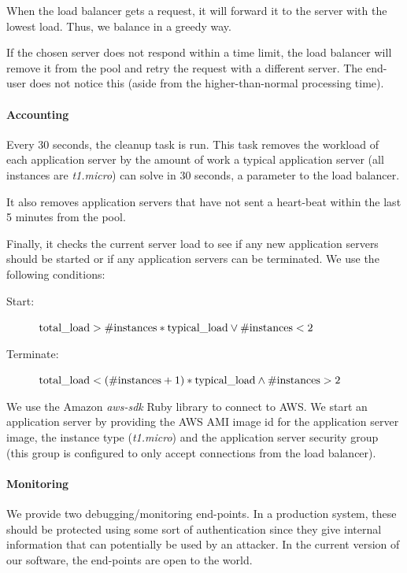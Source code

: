 			When the load balancer gets a request, it will forward it to the server with the lowest load.
			Thus, we balance in a greedy way.
			
			If the chosen server does not respond within a time limit, the load balancer will remove it from the pool and retry the request with a different server.
			The end-user does not notice this (aside from the higher-than-normal processing time).
		
		\paragraph{Accounting}
			Every 30 seconds, the cleanup task is run.
			This task removes the workload of each application server by the amount of work a typical application server (all instances are \textit{t1.micro}) can solve in 30 seconds, a parameter to the load balancer.
			
			It also removes application servers that have not sent a heart-beat within the last 5 minutes from the pool.
			
			Finally, it checks the current server load to see if any new application servers should be started or if any application servers can be terminated.
			We use the following conditions:
			
			\begin{description}
				\item[Start:] $\textnormal{total\_load} > \#\textnormal{instances} * \textnormal{typical\_load} \lor \#\textnormal{instances} < 2$
				\item[Terminate:] $\textnormal{total\_load} < (\#\textnormal{instances} + 1) * \textnormal{typical\_load} \land \#\textnormal{instances} > 2$
			\end{description}
			
			We use the Amazon \textit{aws-sdk} Ruby library to connect to AWS.
			We start an application server by providing the AWS AMI image id for the application server image,
			the instance type (\textit{t1.micro}) and the application server security group (this group is configured to only accept connections from the load balancer).
		
		\paragraph{Monitoring}
			We provide two debugging/monitoring end-points.
			In a production system, these should be protected using some sort of authentication since they give internal information that can potentially be used by an attacker.
			In the current version of our software, the end-points are open to the world.
			
